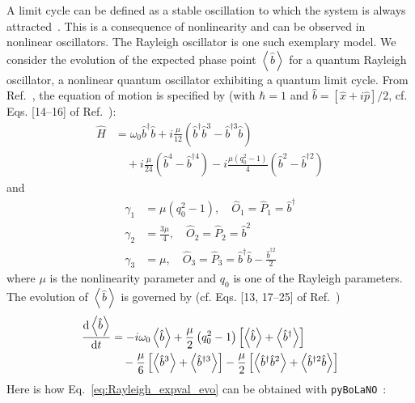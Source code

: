 \documentclass[5p, twocolumn, 10pt, sort&compress]{elsarticle}
\newcommand{\expval}[1]{\left\langle{#1}\right\rangle}
\newcommand{\bop}{\hat{b}}
\newcommand{\bdag}{\bop^\dagger}
\newcommand{\bdagn}[1]{\bop^{\dagger {#1}}}
\newcommand{\pybolano}{\texttt{pyBoLaNO}~}
\begin{document}
A limit cycle can be defined as a stable oscillation to which the system is always attracted~\cite{pikovsky_synchronization_2001}. This is a consequence of nonlinearity and can be observed in nonlinear oscillators. The Rayleigh oscillator is one such exemplary model. We consider the evolution of the expected phase point $\expval{\bop}$ for a quantum Rayleigh oscillator, a nonlinear quantum oscillator exhibiting a quantum limit cycle. From Ref.~\cite{chia_relaxation_2020}, the equation of motion is specified by (with $\hbar=1$ and $\bop=\left[\hat{x}+i\hat{p}\right]/2$, cf. Eqs. [14--16] of Ref.~\cite{chia_relaxation_2020}):
\begin{equation}
\begin{split}
    \hat{H} &= \omega_0\bdag\bop + i\frac{\mu}{12}\left(\bdag\bop^3-\bdagn{3}\bop\right) 
    \\
    &\quad + i\frac{\mu}{24}\left(\bop^4-\bdagn{4}\right) - i\frac{\mu\left(q_0^2-1\right)}{4}\left(\bop^2-\bdagn{2}\right)
\end{split}
\end{equation}
and
\begin{subequations}
\begin{align}
    \gamma_1 &= \mu\left(q_0^2-1\right),\quad \hat{O}_1=\hat{P}_1 = \bdag 
    \\
    \gamma_2 &= \frac{3\mu}{4}, \quad \hat{O}_2 = \hat{P}_2=\bop^2
    \\
    \gamma_3 &= \mu, \quad \hat{O}_3=\hat{P}_3 = \bdag\bop - \frac{\bdagn{2}}{2}
\end{align}
\end{subequations}
where $\mu$ is the nonlinearity parameter and $q_0$ is one of the Rayleigh parameters. The evolution of $\expval{\bop}$ is governed by (cf. Eqs. [13, 17--25] of Ref.~\cite{chia_relaxation_2020})
\begin{equation}\label{eq:Rayleigh_expval_evo}
\begin{split}
    \odv{\expval{\bop}}{t} &= -i\omega_0\expval{\bop} + \frac{\mu}{2} \left(q_0^2-1\right) \left[\expval{\bop}+\expval{\bdag}\right] 
    \\
    &\quad -\frac{\mu}{6}\left[\expval{\bop^3}+\expval{\bdagn{3}}\right] - \frac{\mu}{2}\left[\expval{\bdag\bop^2}+\expval{\bdagn{2}\bop}\right]
\end{split}
\end{equation}
Here is how Eq.~\eqref{eq:Rayleigh_expval_evo} can be obtained with \pybolano:
\end{document}
